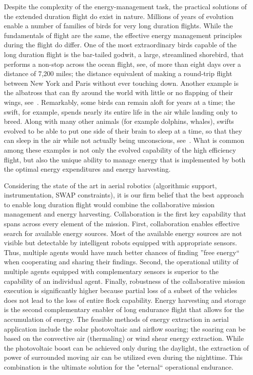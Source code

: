 \documentclass{ifacconf}
\begin{document}
Despite the complexity of the energy-management task, the practical solutions of the extended duration flight do exist in nature. Millions of years of evolution enable a number of families of birds for very long duration flights. While the fundamentals of flight are the same, the effective energy management principles during the flight do differ. One of the most extraordinary birds capable of the long duration flight is the bar-tailed godwit, a large, streamlined shorebird, that performs a non-stop across the ocean flight, see\cite{USGS:2007}, of more than eight days over a distance of 7,200 miles; the distance equivalent of making a round-trip flight between New York and Paris without ever touching down. Another example is the albatross that can fly around the world with little or no flapping of their wings, see~\cite{Richardson:2011}. Remarkably, some birds can remain aloft for years at a time; the swift, for example, spends nearly its entire life in the air while landing only to breed. Along with many other animals (for example dolphins, whales), swifts evolved to be able to put one side of their brain to sleep at a time, so that they can sleep in the air while not actually being unconscious, see~\cite{Lapierre:2007}. What is common among these examples is not only the evolved capability of the high efficiency flight, but also the unique ability to manage energy that is implemented by both the optimal energy expenditures and energy harvesting.

Considering the state of the art in aerial robotics (algorithmic support, instrumentation, SWAP constraints), it is our firm belief that the best approach to enable long duration flight would combine the collaborative mission management and energy harvesting. Collaboration is the first key capability that spans across every element of the mission. First, collaboration enables effective search for available energy sources. Most of the available energy sources are not visible but detectable by intelligent robots equipped with appropriate sensors. Thus, multiple agents would have much better chances of finding ''free energy`` when cooperating and sharing their findings. Second, the operational utility of multiple agents equipped with complementary sensors is superior to the capability of an individual agent. Finally, robustness of the collaborative mission execution is significantly higher because partial loss of a subset of the vehicles does not lead to the loss of entire flock capability. Energy harvesting and storage is the second complementary enabler of long endurance flight that allows for the accumulation of energy. The feasible methods of energy extraction in aerial application include the solar photovoltaic and airflow soaring; the soaring can be based on the convective air (thermaling) or wind shear energy extraction. While the photovoltaic boost can be achieved only during the daylight, the extraction of power of surrounded moving air can be utilized even during the nighttime. This combination is the ultimate solution for the "eternal`` operational endurance.
\end{document}
